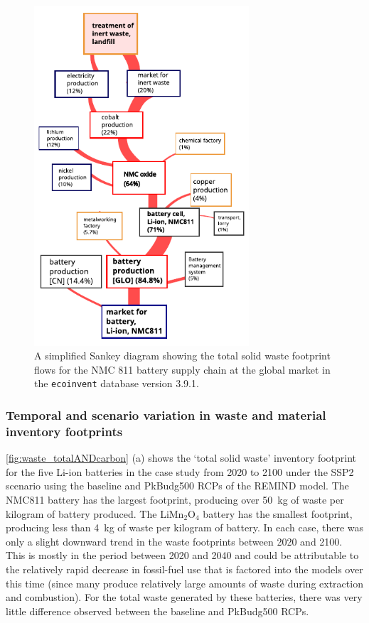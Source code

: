 \begin{figure}[H]
    \centering
    \includegraphics[width=8cm]{figures/T-reX_NMC811_WasteTotalSolid.pdf}
    \caption{A simplified Sankey diagram showing the total solid waste footprint flows for the NMC 811 battery supply chain at the global market in the \texttt{ecoinvent} database version 3.9.1.}\label{fig:sankey_waste}
\end{figure}

\subsubsection{Temporal and scenario variation in waste and material inventory footprints}

\autoref{fig:waste_totalANDcarbon} (a) shows the `total solid waste' inventory footprint for the five Li-ion batteries in the case study from 2020 to 2100 under the SSP2 scenario using the baseline and PkBudg500 RCPs of the REMIND model. The NMC811 battery has the largest footprint, producing over 50~kg of waste per kilogram of battery produced. The  LiMn\(_2\)O\(_4\) battery has the smallest footprint, producing less than 4~kg of waste per kilogram of battery. In each case, there was only a slight downward trend in the waste footprints between 2020 and 2100. This is mostly in the period between 2020 and 2040 and could be attributable to the relatively rapid decrease in fossil-fuel use that is factored into the models over this time (since many produce relatively large amounts of waste during extraction and combustion). For the total waste generated by these batteries, there was very little difference observed between the baseline and PkBudg500 RCPs.

